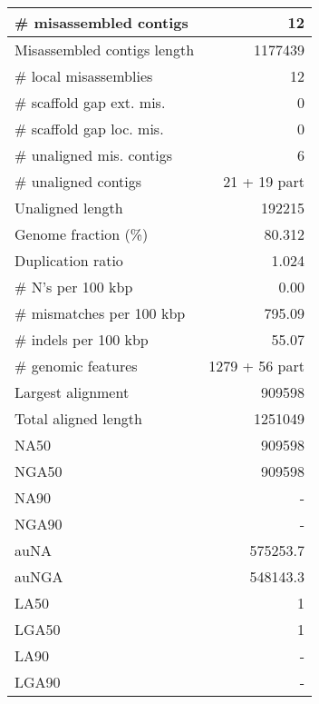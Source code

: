 \documentclass[12pt,a4paper]{article}
\begin{document}
\begin{table}[ht]
\begin{center}
\begin{tabular}{|l*{1}{|r}|}
\# misassembled contigs & 12 \\ \hline
Misassembled contigs length & 1177439 \\ \hline
\# local misassemblies & 12 \\ \hline
\# scaffold gap ext. mis. & 0 \\ \hline
\# scaffold gap loc. mis. & 0 \\ \hline
\# unaligned mis. contigs & 6 \\ \hline
\# unaligned contigs & 21 + 19 part \\ \hline
Unaligned length & 192215 \\ \hline
Genome fraction (\%) & 80.312 \\ \hline
Duplication ratio & 1.024 \\ \hline
\# N's per 100 kbp & 0.00 \\ \hline
\# mismatches per 100 kbp & 795.09 \\ \hline
\# indels per 100 kbp & 55.07 \\ \hline
\# genomic features & 1279 + 56 part \\ \hline
Largest alignment & 909598 \\ \hline
Total aligned length & 1251049 \\ \hline
NA50 & 909598 \\ \hline
NGA50 & 909598 \\ \hline
NA90 & - \\ \hline
NGA90 & - \\ \hline
auNA & 575253.7 \\ \hline
auNGA & 548143.3 \\ \hline
LA50 & 1 \\ \hline
LGA50 & 1 \\ \hline
LA90 & - \\ \hline
LGA90 & - \\ \hline
\end{tabular}
\end{center}
\end{table}
\end{document}
